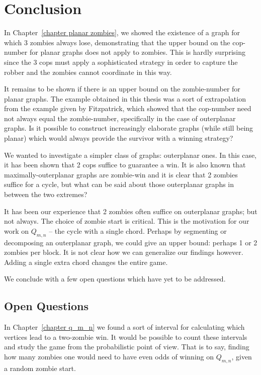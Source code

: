 \chapter{Conclusion}

In Chapter~\ref{chapter planar zombies}, we showed the existence of a graph for which 3 zombies always lose,
demonstrating that the upper bound on the cop-number for planar graphs does not
apply to zombies. This is hardly surprising since the 3 cops must apply a sophisticated
strategy in order to capture the robber and the zombies cannot coordinate in this way.

It remains to be shown if there is an upper bound on the zombie-number for
planar graphs. The example obtained in this thesis was a sort of extrapolation from
the example \cite{fitzpatrick2016deterministic} given by Fitzpatrick, which showed that
the cop-number need not always equal the zombie-number, specifically in the case of outerplanar graphs. Is it possible to construct increasingly elaborate graphs (while still being planar) which would always provide the survivor with a winning strategy?

We wanted to investigate a simpler class of graphs: outerplanar ones. In this case, it has been shown \cite{clarke2002constrained} that 2 cops suffice to guarantee a win.
It is also known that maximally-outerplanar graphs are zombie-win \cite{fitzpatrick2016deterministic}
and it is clear that 2 zombies suffice for a cycle, but what can be said about those
outerplanar graphs in between the two extremes?

It has been our experience that 2 zombies often suffice on outerplanar graphs; but
not always. The choice of zombie start is critical. This is the
motivation for our work on $Q_{m,n}$ -- the cycle with a single chord. Perhaps by segmenting or decomposing an outerplanar graph, we could give an upper bound: perhaps 1 or 2 zombies per block. It is not clear how we can
generalize our findings however. Adding a single extra chord changes the entire game.

We conclude with a few open questions which have yet to be addressed.

\section{Open Questions}

In Chapter~\ref{chapter q_m_n} we found a sort of interval for calculating which vertices lead to a two-zombie win. It would be possible to count these intervals and study the game from the probabilistic point of view. That is to say, finding how many zombies one would need to have even odds of winning on $Q_{m,n}$, given a random zombie start.

